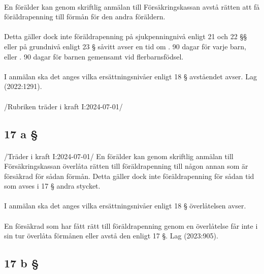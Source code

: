 \documentclass[a4paper,notitlepage,openany,10pt]{book}
\begin{document}
\paragraph*{}
En förälder kan genom skriftlig anmälan till Försäkringskassan avstå rätten att få föräldrapenning till förmån för den andra föräldern.
\paragraph*{}
Detta gäller dock inte föräldrapenning på sjukpenningnivå enligt 21 och 22 §§ eller på grundnivå enligt 23 § såvitt avser en tid om
. 90 dagar för varje barn, eller
. 90 dagar för barnen gemensamt vid flerbarnsfödsel.
\paragraph*{}
I anmälan ska det anges vilka ersättningsnivåer enligt 18 § avståendet avser.
Lag (2022:1291).
\paragraph*{}
/Rubriken träder i kraft I:2024-07-01/
\subsection*{17 a §}
\paragraph*{}
/Träder i kraft I:2024-07-01/
En förälder kan genom skriftlig anmälan till Försäkringskassan överlåta rätten till föräldrapenning till någon annan som är försäkrad för sådan förmån. Detta gäller dock inte föräldrapenning för sådan tid som avses i 17 § andra stycket.
\paragraph*{}
I anmälan ska det anges vilka ersättningsnivåer enligt 18 § överlåtelsen avser.
\paragraph*{}
En försäkrad som har fått rätt till föräldrapenning genom en överlåtelse får inte i sin tur överlåta förmånen eller avstå den enligt 17 §.
Lag (2023:905).
\subsection*{17 b §}
\end{document}

